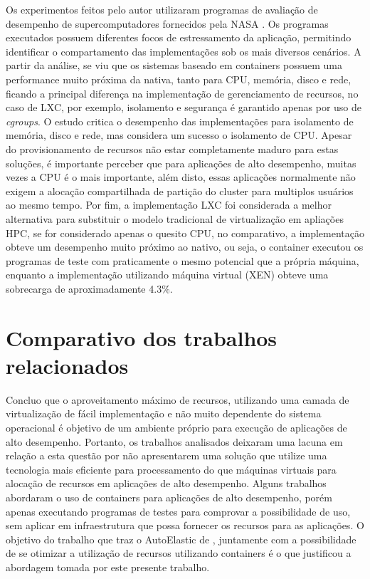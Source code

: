 \documentclass[twoside,english,brazilian]{UNISINOSmonografia}
\begin{document}
Os experimentos feitos pelo autor utilizaram programas de avaliação de desempenho de supercomputadores fornecidos pela NASA \cite{NASA2016}. Os programas executados possuem diferentes focos de estressamento da aplicação, permitindo identificar o compartamento das implementações sob os mais diversos cenários. A partir da análise, se viu que os sistemas baseado em containers possuem uma performance muito próxima da nativa, tanto para CPU, memória, disco e rede, ficando a principal diferença na implementação de gerenciamento de recursos, no caso de  LXC, por exemplo, isolamento e segurança é garantido apenas por uso de \textit{cgroups}. O estudo critica o desempenho das implementações para isolamento de memória, disco e rede, mas considera um sucesso o isolamento de CPU. Apesar do provisionamento de recursos não estar completamente maduro para estas soluções, é importante perceber que para aplicações de alto desempenho, muitas vezes a CPU é o mais importante, além disto, essas aplicações normalmente não exigem a alocação compartilhada de partição do cluster para multiplos usuários ao mesmo tempo. Por fim, a implementação LXC foi considerada a melhor alternativa para substituir o modelo tradicional de virtualização em apliações HPC, se for considerado apenas o quesito CPU, no comparativo, a implementação obteve um desempenho muito próximo ao nativo, ou seja, o container executou os programas de teste com praticamente o mesmo potencial que a própria máquina, enquanto a implementação utilizando máquina virtual (XEN) obteve uma sobrecarga de aproximadamente 4.3\%.


\section{Comparativo dos trabalhos relacionados}

Concluo que o aproveitamento máximo de recursos, utilizando uma camada de virtualização de fácil implementação e não muito dependente do sistema operacional é objetivo de um ambiente próprio para execução de aplicações de alto desempenho. Portanto, os trabalhos analisados deixaram uma lacuna em relação a esta questão por não apresentarem uma solução que utilize uma tecnologia mais eficiente para processamento do que máquinas virtuais para alocação de recursos em aplicações de alto desempenho. Alguns trabalhos abordaram o uso de containers para aplicações de alto desempenho, porém apenas executando programas de testes para comprovar a possibilidade de uso, sem aplicar em infraestrutura que possa fornecer os recursos para as aplicações. O objetivo do trabalho que traz o AutoElastic de , juntamente com a possibilidade de se otimizar a utilização de recursos utilizando containers é o que justificou a abordagem tomada por este presente trabalho.
\end{document}
